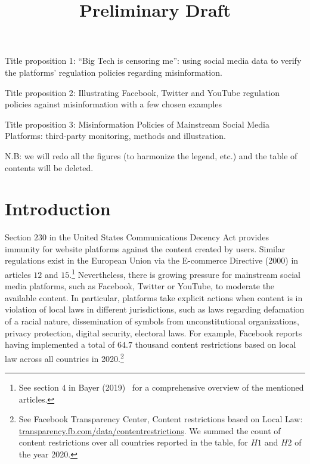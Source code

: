 \documentclass{article}
\begin{document}
\title{Preliminary Draft}

\maketitle

Title proposition 1: ``Big Tech is censoring me'': using social media data to verify the platforms' regulation policies regarding misinformation. 

Title proposition 2: Illustrating Facebook, Twitter and YouTube regulation policies against misinformation with a few chosen examples

Title proposition 3: Misinformation Policies of Mainstream Social Media Platforms: third-party monitoring, methods and illustration.

\smallskip

{\color{pink} \noindent N.B: we will redo all the figures (to harmonize the legend, etc.) and the table of contents will be deleted.} 
\tableofcontents

\section{Introduction}

Section $230$ in the United States Communications Decency Act provides immunity for website platforms against the content created by users. Similar regulations exist in the European Union via the E-commerce Directive (2000) in articles $12$ and $15$.\footnote{See section $4$ in Bayer (2019)~\cite{Bayer} for a comprehensive overview of the mentioned articles.} Nevertheless, there is growing pressure for mainstream social media platforms, such as Facebook, Twitter or YouTube, to moderate the available content. In particular, platforms take explicit actions when content is in violation of local laws in different jurisdictions, such as laws regarding defamation of a racial nature, dissemination of symbols from unconstitutional organizations, privacy protection, digital security, electoral laws. For example, Facebook reports having implemented a total of $64.7$ thousand content restrictions based on local law across all countries in 2020.\footnote{See Facebook Transparency Center, Content restrictions based on Local Law: \href{https://transparency.fb.com/data/content\-restrictions}{transparency.fb.com/data/content\-restrictions}. We summed the count of content restrictions over all countries reported in the table, for $H1$ and $H2$ of the year 2020.} %
\end{document}
